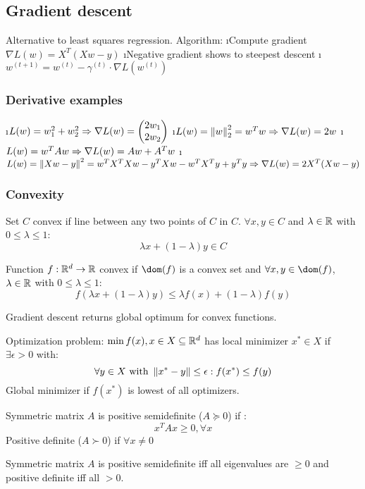 \subsection{Gradient descent}
Alternative to least squares regression. Algorithm:
\be
\i Compute gradient $\nabla L(w) = X^T(Xw-y)$
\i Negative gradient shows to steepest descent
\i $w^{(t+1)} = w^{(t)} - \gamma^{(t)} \cdot \nabla L(w^{(t)})$
\ee

\subsubsection{Derivative examples}

\bi
\i $L(w) = w_1^2 + w_2^2 \\\Rightarrow \nabla L(w) = \begin{pmatrix} 2w_1\\2w_2 \end{pmatrix}$
\i $L(w) = \left\lVert w\right\rVert ^2_2 = w^Tw \\\Rightarrow \nabla L(w) = 2w$
\i $L(w) = w^TAw \\\Rightarrow \nabla L(w) = Aw + A^Tw$
\i $L(w) = \left\lVert Xw-y\right\rVert^2 = w^TX^TXw - y^TXw - w^TX^Ty + y^Ty \\\Rightarrow \nabla L(w) = 2X^T(Xw - y)$
\ei

\subsubsection{Convexity}

Set $C$ convex if line between any two points of $C$ in $C$. $\forall x,y \in C$ and $\lambda \in \mathbb{R}$ with $0 \leq \lambda \leq 1$: \[\lambda x + (1 - \lambda) y \in C\]

Function $f: \mathbb{R}^d \to \mathbb{R}$ convex if $\dom(f)$ is a convex set and $\forall x,y \in \dom(f)$, $\lambda \in \mathbb{R}$ with $0 \leq \lambda \leq 1$: \[f(\lambda x + (1 - \lambda) y) \leq \lambda f(x) + (1 - \lambda) f(y)\]

Gradient descent returns global optimum for convex functions.

Optimization problem: $\min f(x), x \in X \subseteq \mathbb{R}^d$ has local minimizer $x^* \in X$ if $\exists \epsilon > 0$ with:
\[\forall y \in X \text{ with } \left\lVert x^* - y\right\rVert \leq \epsilon: f(x^*) \leq f(y)\]
Global minimizer if $f(x^*)$ is lowest of all optimizers.

Symmetric matrix $A$ is positive semidefinite ($A \succcurlyeq 0$) if :
\[x^TAx \geq 0, \forall x\]
Positive definite ($A \succ 0$) if $\forall x \neq 0$

Symmetric matrix $A$ is positive semidefinite iff all eigenvalues are $\geq 0$ and positive definite iff all $> 0$.

